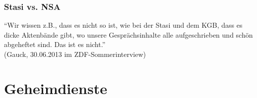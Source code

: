 \documentclass[12pt]{beamer}
\begin{document}
\begin{frame}
  \frametitle{Stasi vs. NSA}
  \begin{center}
     {
      \begin{center}
        ``Wir wissen z.B., dass es nicht so ist, wie bei der Stasi und dem KGB, dass es dicke Aktenbände gibt, wo unsere Gesprächsinhalte alle aufgeschrieben und schön abgeheftet sind. Das ist es nicht.'' \\
        (Gauck, 30.06.2013 im ZDF-Sommerinterview)
      \end{center}
    }
  \end{center}
\end{frame}

\section{Geheimdienste}
\end{document}
